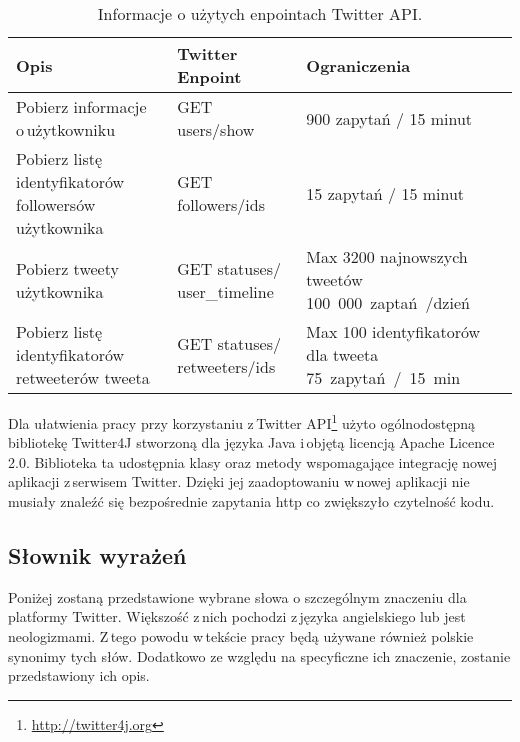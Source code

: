 \begin{table}[!h] \label{tab:endointytwitter} \centering
\caption{Informacje o użytych enpointach Twitter API.}
\begin{tabular} { | m{} | m{}| m{} | } \hline
Opis & Twitter Enpoint & Ograniczenia \\  \hline \hline
Pobierz informacje o\,użytkowniku & GET users/show & 900 zapytań / 15 minut \\ \hline
Pobierz listę identyfikatorów followersów \mbox{użytkownika} & GET followers/ids & 15 zapytań / 15 minut \\ \hline
Pobierz tweety użytkownika & GET statuses/ user\_timeline & Max 3200 najnowszych tweetów \mbox{100 000 zaptań /dzień} \\ \hline
Pobierz listę identyfikatorów retweeterów tweeta & GET statuses/ retweeters/ids & Max 100 identyfikatorów dla tweeta \mbox{75 zapytań / 15 min} 
 \\ \hline
\end{tabular}
\end{table}

\newpage
Dla ułatwienia pracy przy korzystaniu z\,Twitter API\footnote{\url{http://twitter4j.org}} użyto ogólnodostępną bibliotekę Twitter4J  stworzoną dla języka Java i\,objętą licencją Apache Licence 2.0. Biblioteka ta udostępnia klasy oraz metody wspomagające integrację nowej aplikacji z\,serwisem Twitter. Dzięki jej zaadoptowaniu w\,nowej aplikacji nie musiały znaleźć się bezpośrednie zapytania http co zwiększyło czytelność kodu. 

\subsection{Słownik wyrażeń}
Poniżej zostaną przedstawione wybrane słowa o szczególnym znaczeniu dla platformy Twitter. Większość z\,nich pochodzi z\,języka angielskiego lub jest neologizmami. Z\,tego powodu w\,tekście pracy będą używane również polskie synonimy tych słów. Dodatkowo ze względu na specyficzne ich znaczenie, zostanie przedstawiony ich opis.

